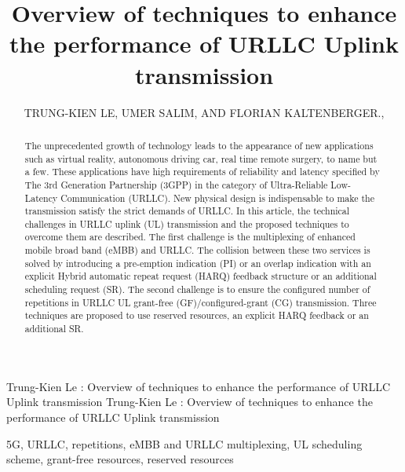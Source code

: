 \documentclass{ieeeaccess}
\begin{document}

\title{Overview of techniques to enhance the performance of URLLC Uplink transmission}
\author{\uppercase{Trung-Kien Le},
\uppercase{Umer Salim, and Florian Kaltenberger}.,
}
\address[1]{EURECOM, Sophia Anitpolis, France (e-mail: author@eurecom.fr)}
\address[2]{TCL Mobile, Sophia Antipolis, France (e-mail: author@tcl.com)}


\markboth
{Trung-Kien Le \headeretal: Overview of techniques to enhance the performance of URLLC Uplink transmission}
{Trung-Kien Le \headeretal: Overview of techniques to enhance the performance of URLLC Uplink transmission}


\begin{abstract}
The unprecedented growth of technology leads to the appearance of new applications such as virtual reality, autonomous driving car, real time remote surgery, to name but a few. These applications have high requirements of reliability and latency specified by The 3rd Generation Partnership (3GPP) in the category of Ultra-Reliable Low-Latency Communication (URLLC). New physical design is indispensable to make the transmission satisfy the strict demands of URLLC. In this article, the technical challenges in URLLC uplink (UL) transmission and the proposed techniques to overcome them are described. The first challenge is the multiplexing of enhanced mobile broad band (eMBB) and URLLC. The collision between these two services is solved by introducing a pre-emption indication (PI) or an overlap indication with an explicit Hybrid automatic repeat request (HARQ) feedback structure or an additional scheduling request (SR). The second challenge is to ensure the configured number of repetitions in URLLC UL grant-free (GF)/configured-grant (CG) transmission. Three techniques are proposed to use reserved resources, an explicit HARQ feedback or an additional SR.
\end{abstract}

\begin{keywords}
5G, URLLC, repetitions, eMBB and URLLC multiplexing, UL scheduling scheme, grant-free resources, reserved resources
\end{keywords}
\end{document}
